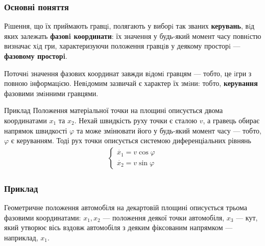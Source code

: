 \documentclass[10pt,pdf]{beamer}
\newcommand{\vf}{\varphi}
\renewcommand{\d}[1]{\dot{#1}}
\begin{document}
    \begin{frame}
        \frametitle{Основні поняття}
    
        Рiшення, що їх приймають гравцi, полягають у виборi так званих \textbf{керувань}, вiд яких залежать \textbf{фазовi координати}: 
        їх значення у будь-який момент часу повнiстю визначає хiд гри, характеризуючи положення гравцiв у деякому просторi — \textbf{фазовому просторi}. 

        Поточнi значення фазових координат завжди вiдомi
        гравцям — тобто, це iгри з повною iнформацiєю. Невiдомим зазвичай є
        характер їх змiни: тобто, \textbf{керування} фазовими змiнними гравцями.
        \begin{block}{Приклад}
            Положення матеріальної точки на площині описується двома координатами $x_1$ та $x_2$. 
            Нехай швидкість руху точки є сталою $v$, а гравець обирає напрямок швидкості $\vf$ та може змінювати його у будь-який момент часу --- тобто, $\vf$
            є керуванням. Тоді рух точки описується системою диференціальних рівнянь
            \begin{gather*}
                \begin{cases}
                    \d{x_1} = v \cos \vf \\
                    \d{x_2} = v \sin \vf
                \end{cases}
            \end{gather*}
        \end{block}
    \end{frame}
    \begin{frame}
        \frametitle{Приклад}
    
        Геометричне положення автомобіля на декартовій площині описується трьома фазовими координатами:
        $x_1, x_2$ --- положення деякої точки автомобіля, $x_3$ --- кут, який утворює вісь вздовж автомобіля
        з деяким фіксованим напрямком --- наприклад, $x_1$.
        \begin{center}
        \end{center}
    \end{frame}
\end{document}
